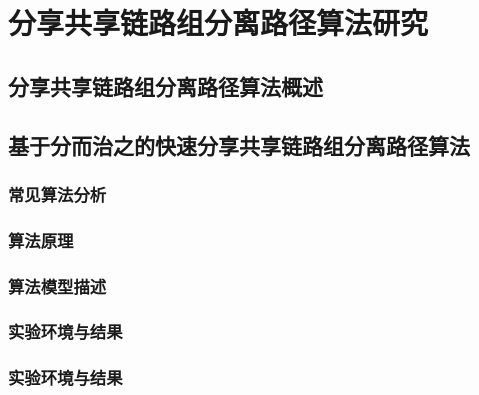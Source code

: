 \chapter{分享共享链路组分离路径算法研究}
\section{分享共享链路组分离路径算法概述}
\section{基于分而治之的快速分享共享链路组分离路径算法}
\subsection{常见算法分析}
\subsection{算法原理}
\subsection{算法模型描述}
\subsection{实验环境与结果}
\subsection{实验环境与结果}